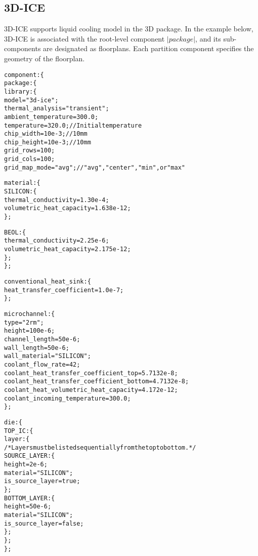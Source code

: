 \subsection{3D-ICE}
\noindent
3D-ICE supports liquid cooling model in the 3D package. 
In the example below, 3D-ICE is associated with the root-level component $|package|$, and its sub-components are designated as floorplans. 
Each partition component specifies the geometry of the floorplan.
{\fontsize{10pt}{11pt}\selectfont
\begin{alltt}
component: \{
    package: \{
        library: \{
            model = "3d-ice";
            thermal_analysis = "transient";
            ambient_temperature = 300.0;
            temperature = 320.0; // Initial temperature
            chip_width = 10e-3; // 10mm
            chip_height = 10e-3; // 10mm
            grid_rows = 100;
            grid_cols = 100;
            grid_map_mode = "avg"; // "avg", "center", "min", or "max"
            
            material: \{
                SILICON: \{
                    thermal_conductivity = 1.30e-4;
                    volumetric_heat_capacity = 1.638e-12;
                \};
                
                BEOL: \{
                    thermal_conductivity = 2.25e-6;
                    volumetric_heat_capacity = 2.175e-12;
                \};
            \};
            
            conventional_heat_sink: \{
                heat_transfer_coefficient = 1.0e-7;
            \};
            
            microchannel: \{
                type = "2rm";
                height = 100e-6;
                channel_length = 50e-6;
                wall_length = 50e-6;
                wall_material = "SILICON";
                coolant_flow_rate = 42;
                coolant_heat_transfer_coefficient_top = 5.7132e-8;
                coolant_heat_transfer_coefficient_bottom = 4.7132e-8;
                coolant_heat_volumetric_heat_capacity = 4.172e-12;
                coolant_incoming_temperature = 300.0;
            \};
            
            die: \{
                TOP_IC: \{
                    layer: \{
                        /* Layers must be listed sequentially from the top to bottom. */
                        SOURCE_LAYER: \{
                            height = 2e-6;
                            material = "SILICON";
                            is_source_layer = true;
                        \};
                        BOTTOM_LAYER: \{
                            height = 50e-6;
                            material = "SILICON";
                            is_source_layer = false;
                        \};
                    \};
                \};
                

\end{alltt}}
